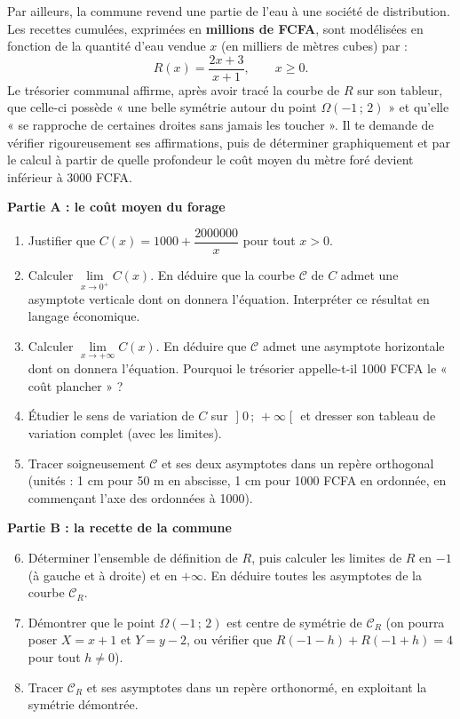 \documentclass[11pt]{article}
\newcounter{popsec}
\newcounter{popsub}
\newcommand{\courssub}[1]{%
  \stepcounter{popsub}%
  \par\vspace{9pt}\noindent{\popxbold\fontsize{11.5}{13}\selectfont\color{popink}{\color{poporange}\thepopsec.\thepopsub}\hspace{6pt}#1}\par\nopagebreak\vspace{4pt}
}
\begin{document}
Par ailleurs, la commune revend une partie de l'eau à une société de distribution. Les recettes cumulées, exprimées en \textbf{millions de FCFA}, sont modélisées en fonction de la quantité d'eau vendue $x$ (en milliers de mètres cubes) par :
\[ R(x) = \frac{2x+3}{x+1}, \qquad x \geq 0. \]
Le trésorier communal affirme, après avoir tracé la courbe de $R$ sur son tableur, que celle-ci possède « une belle symétrie autour du point $\Omega(-1\,;\,2)$ » et qu'elle « se rapproche de certaines droites sans jamais les toucher ». Il te demande de vérifier rigoureusement ses affirmations, puis de déterminer graphiquement et par le calcul à partir de quelle profondeur le coût moyen du mètre foré devient inférieur à \num{3000} FCFA.

\courssub{Consignes}

\textbf{Partie A : le coût moyen du forage}
\begin{enumerate}
\item Justifier que $C(x) = \num{1000} + \dfrac{\num{2000000}}{x}$ pour tout $x > 0$.
\item Calculer $\lim\limits_{x \to 0^+} C(x)$. En déduire que la courbe $\mathcal{C}$ de $C$ admet une asymptote verticale dont on donnera l'équation. Interpréter ce résultat en langage économique.
\item Calculer $\lim\limits_{x \to +\infty} C(x)$. En déduire que $\mathcal{C}$ admet une asymptote horizontale dont on donnera l'équation. Pourquoi le trésorier appelle-t-il \num{1000} FCFA le « coût plancher » ?
\item Étudier le sens de variation de $C$ sur $\mathopen]0\,;\,+\infty\mathclose[$ et dresser son tableau de variation complet (avec les limites).
\item Tracer soigneusement $\mathcal{C}$ et ses deux asymptotes dans un repère orthogonal (unités : 1 cm pour 50 m en abscisse, 1 cm pour \num{1000} FCFA en ordonnée, en commençant l'axe des ordonnées à \num{1000}).
\end{enumerate}

\textbf{Partie B : la recette de la commune}
\begin{enumerate}
\setcounter{enumi}{5}
\item Déterminer l'ensemble de définition de $R$, puis calculer les limites de $R$ en $-1$ (à gauche et à droite) et en $+\infty$. En déduire toutes les asymptotes de la courbe $\mathcal{C}_R$.
\item Démontrer que le point $\Omega(-1\,;\,2)$ est centre de symétrie de $\mathcal{C}_R$ (on pourra poser $X = x+1$ et $Y = y - 2$, ou vérifier que $R(-1-h) + R(-1+h) = 4$ pour tout $h \neq 0$).
\item Tracer $\mathcal{C}_R$ et ses asymptotes dans un repère orthonormé, en exploitant la symétrie démontrée.
\end{enumerate}
\end{document}
